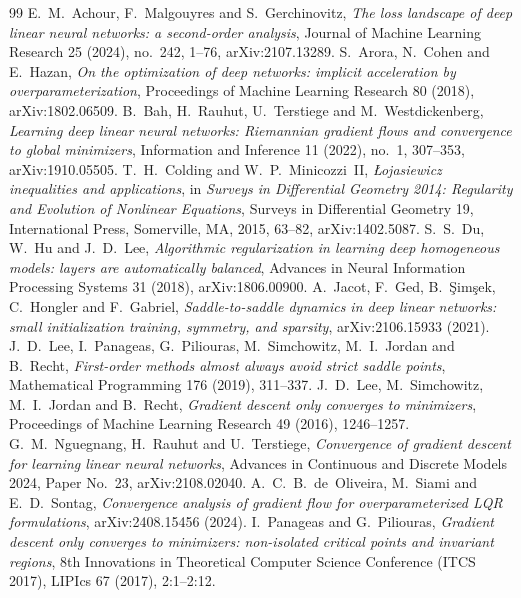 \documentclass[11pt]{amsart}
\theoremstyle{definition}
\theoremstyle{remark}
\numberwithin{equation}{section}
\begin{document}
\appendix


\begin{thebibliography}{99}
 E.~M.~Achour, F.~Malgouyres and S.~Gerchinovitz, \emph{The loss landscape of deep linear neural networks: a second-order analysis}, Journal of Machine Learning Research 25 (2024), no.~242, 1--76, arXiv:2107.13289.
 S.~Arora, N.~Cohen and E.~Hazan, \emph{On the optimization of deep networks: implicit acceleration by overparameterization}, Proceedings of Machine Learning Research 80 (2018), arXiv:1802.06509.
 B.~Bah, H.~Rauhut, U.~Terstiege and M.~Westdickenberg, \emph{Learning deep linear neural networks: Riemannian gradient flows and convergence to global minimizers}, Information and Inference 11 (2022), no.~1, 307--353, arXiv:1910.05505.
 T.~H.~Colding and W.~P.~Minicozzi~II, \emph{\L{}ojasiewicz inequalities and applications}, in \emph{Surveys in Differential Geometry 2014: Regularity and Evolution of Nonlinear Equations}, Surveys in Differential Geometry 19, International Press, Somerville, MA, 2015, 63--82, arXiv:1402.5087.
 S.~S.~Du, W.~Hu and J.~D.~Lee, \emph{Algorithmic regularization in learning deep homogeneous models: layers are automatically balanced}, Advances in Neural Information Processing Systems 31 (2018), arXiv:1806.00900.
 A.~Jacot, F.~Ged, B.~\c{S}im\c{s}ek, C.~Hongler and F.~Gabriel, \emph{Saddle-to-saddle dynamics in deep linear networks: small initialization training, symmetry, and sparsity}, arXiv:2106.15933 (2021).
 J.~D.~Lee, I.~Panageas, G.~Piliouras, M.~Simchowitz, M.~I.~Jordan and B.~Recht, \emph{First-order methods almost always avoid strict saddle points}, Mathematical Programming 176 (2019), 311--337.
 J.~D.~Lee, M.~Simchowitz, M.~I.~Jordan and B.~Recht, \emph{Gradient descent only converges to minimizers}, Proceedings of Machine Learning Research 49 (2016), 1246--1257.
 G.~M.~Nguegnang, H.~Rauhut and U.~Terstiege, \emph{Convergence of gradient descent for learning linear neural networks}, Advances in Continuous and Discrete Models 2024, Paper No.~23, arXiv:2108.02040.
 A.~C.~B.~de~Oliveira, M.~Siami and E.~D.~Sontag, \emph{Convergence analysis of gradient flow for overparameterized LQR formulations}, arXiv:2408.15456 (2024).
 I.~Panageas and G.~Piliouras, \emph{Gradient descent only converges to minimizers: non-isolated critical points and invariant regions}, 8th Innovations in Theoretical Computer Science Conference (ITCS 2017), LIPIcs 67 (2017), 2:1--2:12.

\end{thebibliography}
\end{document}
